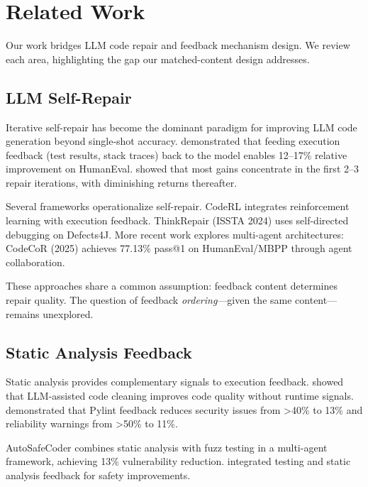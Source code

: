 \section{Related Work}
\label{sec:related}

Our work bridges LLM code repair and feedback mechanism design. We review each area, highlighting the gap our matched-content design addresses.

\subsection{LLM Self-Repair}

Iterative self-repair has become the dominant paradigm for improving LLM code generation beyond single-shot accuracy. \citet{olausson2023selfrepair} demonstrated that feeding execution feedback (test results, stack traces) back to the model enables 12--17\% relative improvement on HumanEval. \citet{arimbur2026tries} showed that most gains concentrate in the first 2--3 repair iterations, with diminishing returns thereafter.

Several frameworks operationalize self-repair. CodeRL \citep{le2022coderl} integrates reinforcement learning with execution feedback. ThinkRepair (ISSTA 2024) uses self-directed debugging on Defects4J. More recent work explores multi-agent architectures: CodeCoR (2025) achieves 77.13\% pass@1 on HumanEval/MBPP through agent collaboration.

These approaches share a common assumption: feedback content determines repair quality. The question of feedback \emph{ordering}---given the same content---remains unexplored.

\subsection{Static Analysis Feedback}

Static analysis provides complementary signals to execution feedback. \citet{jain2024llmcleaning} showed that LLM-assisted code cleaning improves code quality without runtime signals. \citet{blyth2025static} demonstrated that Pylint feedback reduces security issues from >40\% to 13\% and reliability warnings from >50\% to 11\%.

AutoSafeCoder \citep{nunez2024autosafecoder} combines static analysis with fuzz testing in a multi-agent framework, achieving 13\% vulnerability reduction. \citet{dolcetti2024helping} integrated testing and static analysis feedback for safety improvements.

